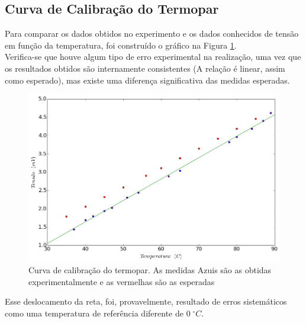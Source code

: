 \documentclass[12pt,a4paper]{article}
\begin{document}
\subsection{Curva de Calibração do Termopar}
Para comparar os dados obtidos no experimento e os dados conhecidos de tensão em função da temperatura, foi construído o gráfico na Figura \ref{termopar}.  \\
Verifica-se que houve algum tipo de erro experimental na realização, uma vez que os resultados obtidos são internamente consistentes (A relação é linear, assim como esperado), mas existe uma diferença significativa das medidas esperadas.

 
\begin{figure}[!htbp]
\includegraphics[scale=0.55]{termopar.png}
\caption{Curva de calibração do termopar. As medidas Azuis são as obtidas experimentalmente e as vermelhas são as esperadas}
\label{termopar}
\end{figure}

Esse deslocamento da reta, foi, provavelmente, resultado de erros sistemáticos como uma temperatura de referência diferente de $0 \; ^{\circ} C$.
\end{document}
